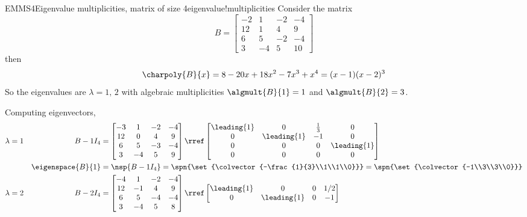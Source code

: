 \begin{example}{EMMS4}{Eigenvalue multiplicities, matrix of size 4}{eigenvalue!multiplicities}
Consider the matrix
%
\begin{equation*}
B=
\begin{bmatrix}
-2 & 1 & -2 & -4\\ 
12 & 1 & 4 & 9\\ 
6 & 5 & -2 & -4\\ 
3 & -4 & 5 & 10
\end{bmatrix}
\end{equation*}
%
then
%
\begin{equation*}
\charpoly{B}{x}=8-20x+18x^2-7x^3+x^4=(x-1)(x-2)^3
\end{equation*}
%
So the eigenvalues are $\lambda=1,\,2$ with algebraic multiplicities $\algmult{B}{1}=1$ and $\algmult{B}{2}=3$.\par
%
Computing eigenvectors,
%
\begin{align*}
\lambda&=1&B- 1I_4&=
\begin{bmatrix}
-3 & 1 & -2 & -4\\ 
12 & 0 & 4 & 9\\ 
6 & 5 & -3 & -4\\ 
3 & -4 & 5 & 9
\end{bmatrix}
\rref
\begin{bmatrix}
\leading{1} & 0 & \frac{1}{3} & 0\\ 
0 & \leading{1} & -1 & 0\\ 
0 & 0 & 0 & \leading{1}\\ 
0 & 0 & 0 & 0
\end{bmatrix}\\
&&\eigenspace{B}{1}&=\nsp{B-1I_4}
=\spn{\set{\colvector{-\frac{1}{3}\\1\\1\\0}}}
=\spn{\set{\colvector{-1\\3\\3\\0}}}\\
%
\lambda&=2&B-2I_4&=
\begin{bmatrix}
-4 & 1 & -2 & -4\\ 
12 & -1 & 4 & 9\\ 
6 & 5 & -4 & -4\\ 
3 & -4 & 5 & 8
\end{bmatrix}
\rref
\begin{bmatrix}
\leading{1} & 0 & 0 & 1/2\\ 
0 & \leading{1} & 0 & -1\\ 

\end{bmatrix}
\end{align*}
\end{example}
